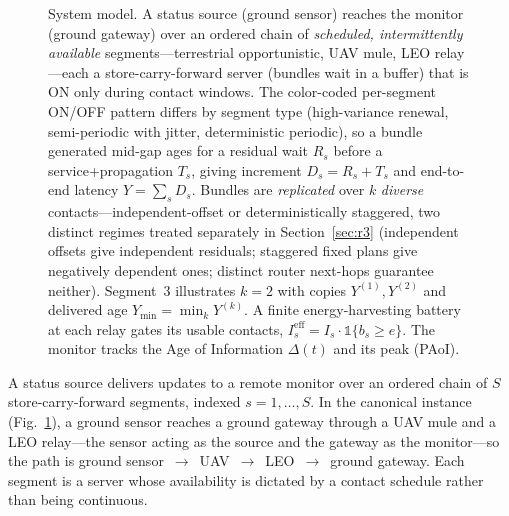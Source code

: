 \documentclass[twocolumn,3p,times,procedia]{elsarticle}
\begin{document}
\begin{figure}[t]
{}
\caption{System model. A status source (ground sensor) reaches the
monitor (ground gateway) over an ordered chain of \emph{scheduled,
intermittently available} segments---terrestrial opportunistic, UAV
mule, LEO relay---each a store-carry-forward server (bundles wait in a
buffer) that is ON only during contact windows. The color-coded
per-segment ON/OFF pattern differs by segment type (high-variance renewal,
semi-periodic with jitter, deterministic periodic), so a bundle generated
mid-gap ages for a residual wait $R_s$ before a service+propagation
$T_s$, giving increment $D_s=R_s+T_s$ and end-to-end latency
$Y=\sum_s D_s$. Bundles are \emph{replicated} over $k$ \emph{diverse}
contacts---independent-offset or deterministically staggered, two
distinct regimes treated separately in Section~\ref{sec:r3} (independent
offsets give independent residuals; staggered fixed plans give
negatively dependent ones; distinct router next-hops guarantee
neither). Segment~3 illustrates $k{=}2$ with
copies $Y^{(1)},Y^{(2)}$ and delivered age $Y_{\min}=\min_k Y^{(k)}$. A
finite energy-harvesting battery at each relay gates its usable contacts,
$I^{\mathrm{eff}}_s=I_s\cdot\mathbb{1}\{b_s\ge e\}$.
The monitor tracks the Age of Information $\Delta(t)$ and its peak (PAoI).}
\label{fig:model}
\end{figure}

A status source delivers updates to a remote monitor over an ordered
chain of $S$ store-carry-forward segments, indexed $s=1,\dots,S$. In the
canonical instance (Fig.~\ref{fig:model}), a ground sensor reaches a
ground gateway through a UAV mule and a LEO relay---the sensor acting as
the source and the gateway as the monitor---so the path is ground
sensor~$\to$~UAV~$\to$~LEO~$\to$~ground gateway. Each segment is a server
whose availability is dictated by a contact schedule rather than being
continuous.
\end{document}
